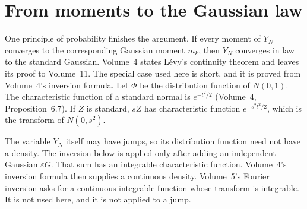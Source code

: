 \section{From moments to the Gaussian law}

One principle of probability finishes the argument. If every moment of $Y_N$ converges to the corresponding Gaussian moment $m_k$, then $Y_N$ converges in law to the standard Gaussian. Volume~4 states Lévy's continuity theorem and leaves its proof to Volume~11. The special case used here is short, and it is proved from Volume~4's inversion formula. Let $\Phi$ be the distribution function of $N(0,1)$. The characteristic function of a standard normal is $e^{-t^2/2}$ (Volume~4, Proposition~6.7). If $Z$ is standard, $sZ$ has characteristic function $e^{-s^2t^2/2}$, which is the transform of $N(0,s^2)$.

The variable $Y_N$ itself may have jumps, so its distribution function need not have a density. The inversion below is applied only after adding an independent Gaussian $\varepsilon G$. That sum has an integrable characteristic function. Volume~4's inversion formula then supplies a continuous density. Volume~5's Fourier inversion asks for a continuous integrable function whose transform is integrable. It is not used here, and it is not applied to a jump.


